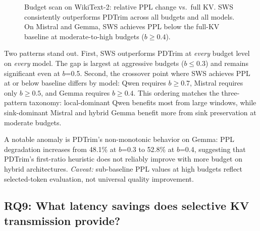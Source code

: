 \documentclass[11pt]{article}
\newcommand{\sws}{SWS}
\newcommand{\pct}{\%}
\theoremstyle{definition}
\theoremstyle{plain}
\begin{document}
\begin{figure}[t]
\caption{Budget scan on WikiText-2: relative PPL change vs.\ full KV.  \sws{} consistently outperforms PDTrim across all budgets and all models.  On Mistral and Gemma, \sws{} achieves PPL below the full-KV baseline at moderate-to-high budgets ($b \ge 0.4$).}
\label{fig:budget-scan}
\end{figure}

Two patterns stand out.  First, \sws{} outperforms PDTrim at \emph{every} budget level on \emph{every} model.  The gap is largest at aggressive budgets ($b \le 0.3$) and remains significant even at $b$=0.5.  Second, the crossover point where \sws{} achieves PPL at or below baseline differs by model: Qwen requires $b \ge 0.7$, Mistral requires only $b \ge 0.5$, and Gemma requires $b \ge 0.4$.  This ordering matches the three-pattern taxonomy: local-dominant Qwen benefits most from large windows, while sink-dominant Mistral and hybrid Gemma benefit more from sink preservation at moderate budgets.

A notable anomaly is PDTrim's non-monotonic behavior on Gemma: PPL degradation increases from 48.1\pct{} at $b$=0.3 to 52.8\pct{} at $b$=0.4, suggesting that PDTrim's first-ratio heuristic does not reliably improve with more budget on hybrid architectures.  \emph{Caveat:} sub-baseline PPL values at high budgets reflect selected-token evaluation, not universal quality improvement.

\subsection{RQ9: What latency savings does selective KV transmission provide?}
\label{sec:rq9}
\end{document}
